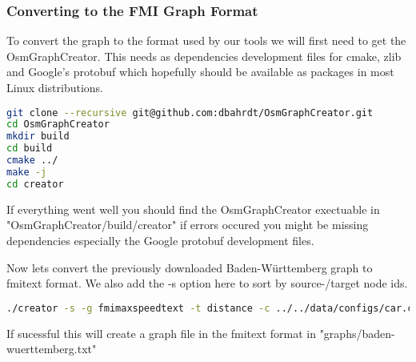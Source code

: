 \documentclass[titlepage,parskip=true]{scrartcl}
\begin{document}
\subsubsection{Converting to the FMI Graph Format}
To convert the graph to the format used by our tools we will first need to get
the OsmGraphCreator. This needs as dependencies development files for cmake,
zlib and Google's protobuf which hopefully should be available as packages in
most Linux distributions.
\begin{lstlisting}[language=bash]
git clone --recursive git@github.com:dbahrdt/OsmGraphCreator.git
cd OsmGraphCreator
mkdir build
cd build
cmake ../
make -j
cd creator
\end{lstlisting}
If everything went well you should find the OsmGraphCreator exectuable in
"OsmGraphCreator/build/creator" if errors occured you might be missing
dependencies especially the Google protobuf development files.

Now lets convert the previously downloaded Baden-Württemberg graph to fmitext format.
We also add the -s option here to sort by source-/target node ids.
\begin{lstlisting}[language=bash]
./creator -s -g fmimaxspeedtext -t distance -c ../../data/configs/car.cfg -o ../../../graphs/baden-wuerttemberg.txt ../../../graphs/baden-wuerttemberg-latest.osm.pbf
\end{lstlisting}
If sucessful this will create a graph file in the fmitext format in "graphs/baden-wuerttemberg.txt"
\end{document}
